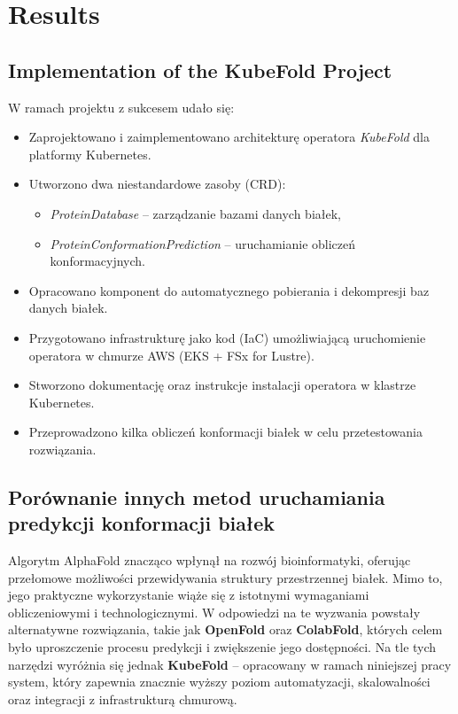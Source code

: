 \chapter{Results}


\section{Implementation of the KubeFold Project}

W ramach projektu z sukcesem udało się:
\begin{itemize}
    \item Zaprojektowano i zaimplementowano architekturę operatora \textit{KubeFold} dla platformy Kubernetes.
    \item Utworzono dwa niestandardowe zasoby (CRD):
    \begin{itemize}
        \item \textit{ProteinDatabase} – zarządzanie bazami danych białek,
        \item \textit{ProteinConformationPrediction} – uruchamianie obliczeń konformacyjnych.
    \end{itemize}
    \item Opracowano komponent do automatycznego pobierania i dekompresji baz danych białek.
    \item Przygotowano infrastrukturę jako kod (IaC) umożliwiającą uruchomienie operatora w chmurze AWS (EKS + FSx for Lustre).
    \item Stworzono dokumentację oraz instrukcje instalacji operatora w klastrze Kubernetes.
    \item Przeprowadzono kilka obliczeń konformacji białek w celu przetestowania rozwiązania.
\end{itemize}


\section{Porównanie innych metod uruchamiania predykcji konformacji białek}

Algorytm AlphaFold znacząco wpłynął na rozwój bioinformatyki, oferując przełomowe możliwości przewidywania struktury przestrzennej białek. Mimo to, jego praktyczne wykorzystanie wiąże się z istotnymi wymaganiami obliczeniowymi i technologicznymi. W odpowiedzi na te wyzwania powstały alternatywne rozwiązania, takie jak \textbf{OpenFold} oraz \textbf{ColabFold}, których celem było uproszczenie procesu predykcji i zwiększenie jego dostępności. Na tle tych narzędzi wyróżnia się jednak \textbf{KubeFold} – opracowany w ramach niniejszej pracy system, który zapewnia znacznie wyższy poziom automatyzacji, skalowalności oraz integracji z infrastrukturą chmurową.

